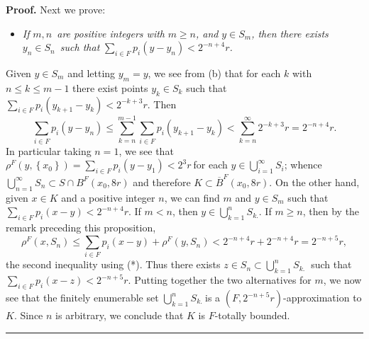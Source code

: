 \documentclass[10pt,a4paper]{amsart}
\newenvironment{proof}[1][Proof]{\noindent\textbf{#1.} }{\ \rule{0.5em}{0.5em}}
\begin{document}
\begin{proof}
Next we prove:

\begin{itemize}
\item[(*)] \emph{If }$m,n$\emph{\ are positive integers with }$m\geq n$\emph{,
and }$y\in S_{m}$\emph{, then there exists }$y_{n}\in S_{n}$\emph{\ such that
}$\sum_{i\in F}p_{i}(y-y_{n})<2^{-n+4}r$\emph{.}
\end{itemize}

%

\noindent
Given $y\in S_{m}$ and letting $y_{m}=y$, we see from (b) that for each $k$
with $n\leq k\leq m-1$ there exist points $y_{k}\in S_{k}$ such that
$\sum_{i\in F}p_{i}(y_{k+1}-y_{k})<2^{-k+3}r$. Then%
\[
\sum_{i\in F}p_{i}(y-y_{n})\leqslant\sum_{k=n}^{m-1}\sum_{i\in F}p_{i}%
(y_{k+1}-y_{k})<\sum_{k=n}^{\infty}2^{-k+3}r=2^{-n+4}r.
\]
In particular taking $n=1$, we see that $\rho^{F}(y,\left\{  x_{0}\right\}
)=\sum_{i\in F}p_{i}(y-y_{1})<2^{3}r~$for each $y\in\bigcup\limits_{i=1}%
^{\infty}S_{i}$; whence $\bigcup\limits_{n=1}^{\infty}S_{n}\subset S\cap
B^{F}(x_{0},8r)$ and therefore $K\subset\overline{B}^{F}(x_{0},8r)$. On the
other hand, given $x\in K$ and a positive integer $n$, we can find $m$ and
$y\in S_{m}$ such that $\sum_{i\in F}p_{i}(x-y)<2^{-n+4}r$. If $m<n$, then
$y\in\bigcup\limits_{k=1}^{n}S_{k\text{.}}$. If $m\geq n$, then by the remark
preceding this proposition,%
\[
\rho^{F}(x,S_{n})\leqslant\sum_{i\in F}p_{i}(x-y)+\rho^{F}(y,S_{n}%
)<2^{-n+4}r+2^{-n+4}r=2^{-n+5}r,
\]
the second inequality using (*). Thus there exists $z\in S_{n}\subset
\bigcup\limits_{k=1}^{n}S_{k\text{. }}$ such that $\sum_{i\in F}%
p_{i}(x-z)<2^{-n+5}r$. Putting together the two alternatives for $m$, we now
see that the finitely enumerable set $\bigcup\limits_{k=1}^{n}S_{k\text{. }}%
$is a $\left(  F,2^{-n+5}r\right)  $-approximation to $K$. Since $n$ is
arbitrary, we conclude that $K$ is $F$-totally bounded.
\end{proof}
\end{document}
